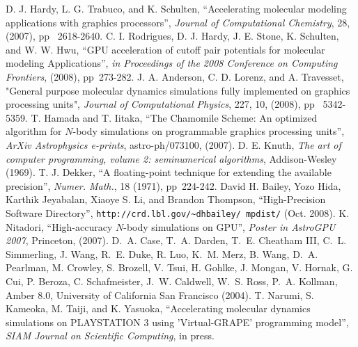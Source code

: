 \begin{thebibliography}{10}
{{D. J. Hardy, L. G. Trabuco, and K. Schulten}, ``Accelerating molecular
modeling applications with graphics processors'', {\it Journal of
Computational Chemistry}, 28, (2007), pp~ 2618-2640.\vspace*{-1mm}
 {C. I. Rodrigues, D. J. Hardy, J. E. Stone,
K. Schulten, and W. W. Hwu}, ``GPU acceleration of cutoff pair
potentials for molecular modeling Applications'', {\it in Proceedings
of the 2008 Conference on Computing Frontiers}, (2008), pp~273-282.\vspace*{-1mm}
{J. A. Anderson, C. D. Lorenz, and A. Travesset},
"General purpose molecular dynamics simulations fully implemented
on graphics processing units",
{\it Journal of Computational Physics}, 227, 10, (2008), pp~ 5342-5359.\vspace*{-1mm}
 {T. Hamada and T. Iitaka}, ``The Chamomile Scheme:
An optimized algorithm for $N$-body simulations on programmable
graphics processing units'', {\it ArXiv Astrophysics e-prints},
astro-ph/073100, (2007).\vspace*{-1mm}
 {D. E. Knuth}, {\it The art of computer programming,
volume 2: seminumerical algorithms}, Addison-Wesley (1969).\vspace*{-1mm}
 {T. J. Dekker}, ``A floating-point technique for
extending the available precision'', {\it Numer. Math.}, 18 (1971),
pp~224-242.\vspace*{-1mm}
 David H. Bailey, Yozo Hida, Karthik
Jeyabalan, Xiaoye S. Li, and Brandon Thompson, ``High-Precision
Software Directory'', {\tt http://crd.lbl.gov/\~{}dhbailey/ mpdist/}
(Oct. 2008).\vspace*{-1mm}
 {K. Nitadori}, ``High-accuracy $N$-body simulations
on GPU'', {\it Poster in AstroGPU 2007}, Princeton, (2007).\vspace*{-1mm}
 {D.~A. Case, T.~A. Darden, T.~E. Cheatham III,
C.~L. Simmerling, J. Wang, R.~E. Duke, R. Luo, K.~M. Merz, B. Wang,
D.~A. Pearlman, M. Crowley, S. Brozell, V. Tsui, H. Gohlke, J. Mongan,
V. Hornak, G. Cui, P. Beroza, C. Schafmeister, J.~W. Caldwell,
W.~S. Ross, P.~A. Kollman}, {Amber 8.0}, University of California San
Francisco (2004).\vspace*{-1mm}
 {T. Narumi, S. Kameoka, M. Taiji, and K. Yasuoka},
``Accelerating molecular dynamics simulations on PLAYSTATION 3 using
'Virtual-GRAPE' programming model'', {\it SIAM Journal on Scientific
Computing}, in press.\vspace*{-1mm}
}
\end{thebibliography}






